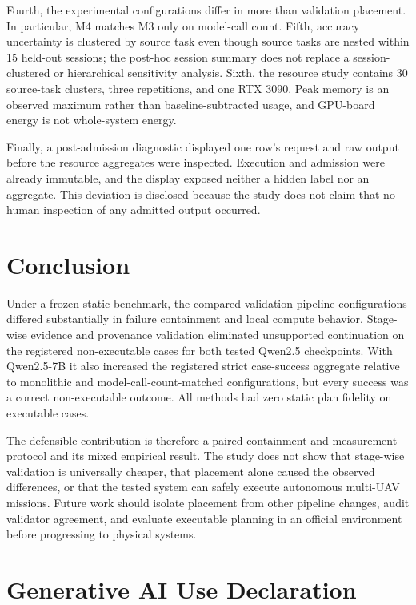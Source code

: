 \documentclass{article}
\newcommand{\Mthree}{\textsc{M3}\xspace}
\newcommand{\Mfour}{\textsc{M4}\xspace}
\begin{document}
Fourth, the experimental configurations differ in more than validation
placement. In particular, \Mfour matches \Mthree only on model-call count.
Fifth, accuracy uncertainty is clustered by source task even though source
tasks are nested within 15 held-out sessions; the post-hoc session summary does
not replace a session-clustered or hierarchical sensitivity analysis. Sixth,
the resource study contains 30 source-task clusters, three repetitions, and one
RTX 3090. Peak memory is an observed maximum rather than baseline-subtracted
usage, and GPU-board energy is not whole-system energy.

Finally, a post-admission diagnostic displayed one row's request and raw output
before the resource aggregates were inspected. Execution and admission were
already immutable, and the display exposed neither a hidden label nor an
aggregate. This deviation is disclosed because the study does not claim that
no human inspection of any admitted output occurred.

\section{Conclusion}

Under a frozen static benchmark, the compared validation-pipeline
configurations differed substantially in failure containment and local compute
behavior. Stage-wise evidence and provenance validation eliminated unsupported
continuation on the registered non-executable cases for both tested Qwen2.5
checkpoints. With Qwen2.5-7B it also increased the registered strict case-success
aggregate relative to monolithic and model-call-count-matched configurations,
but every success was a correct non-executable outcome. All methods had zero
static plan fidelity on executable cases.

The defensible contribution is therefore a paired containment-and-measurement
protocol and its mixed empirical result. The study does not show that
stage-wise validation is universally cheaper, that placement alone caused the
observed differences, or that the tested system can safely execute autonomous
multi-UAV missions. Future work should isolate placement from other pipeline
changes, audit validator agreement, and evaluate executable planning in an
official environment before progressing to physical systems.

\section*{Generative AI Use Declaration}
\end{document}
